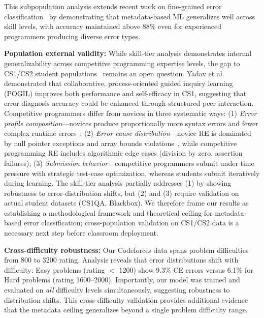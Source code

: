 \documentclass[acmsmall]{acmart}
\begin{document}
This subpopulation analysis extends recent work on fine-grained error
classification~\cite{altadmri2015most} by demonstrating that
metadata-based ML generalizes well across skill levels, with accuracy
maintained above 88\% even for experienced programmers producing diverse
error types.

\textbf{Population external validity:} While skill-tier analysis demonstrates
internal generalizability across competitive programming expertise levels, the
gap to CS1/CS2 student populations~\cite{yadav2021collaborative} remains an open question. Yadav et al.~\cite{yadav2021collaborative} demonstrated that collaborative, process-oriented guided inquiry learning (POGIL) improves both performance and self-efficacy in CS1, suggesting that error diagnosis accuracy could be enhanced through structured peer interaction. Competitive
programmers differ from novices in three systematic ways: (1) \emph{Error
profile composition}---novices produce proportionally more syntax errors and
fewer complex runtime errors~\cite{altadmri2015most}; (2) \emph{Error cause
distribution}---novice RE is dominated by null pointer exceptions and array
bounds violations~\cite{jadud2006exploring}, while competitive programming RE
includes algorithmic edge cases (division by zero, assertion failures); (3)
\emph{Submission behavior}---competitive programmers submit under time pressure
with strategic test-case optimization, whereas students
submit iteratively during learning. The skill-tier analysis partially addresses
(1) by showing robustness to error-distribution shifts, but (2) and (3) require
validation on actual student datasets (CS1QA\cite{lee2022cs1qa}, Blackbox). We therefore frame
our results as establishing a methodological framework and theoretical ceiling
for metadata-based error classification; cross-population validation on CS1/CS2
data is a necessary next step before classroom deployment.

\textbf{Cross-difficulty robustness:} Our Codeforces data spans problem difficulties
from 800 to 3200 rating. Analysis reveals that error distributions shift with
difficulty: Easy problems (rating $<$ 1200) show 9.3\% CE errors versus 6.1\%
for Hard problems (rating 1600--2000). Importantly, our model was trained and
evaluated on \emph{all} difficulty levels simultaneously, suggesting robustness to
distribution shifts. This cross-difficulty validation provides additional evidence
that the metadata ceiling generalizes beyond a single problem difficulty range.
\end{document}
